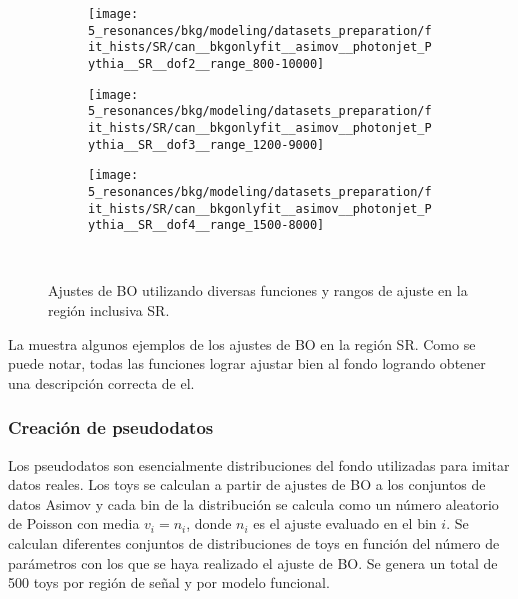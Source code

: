 \begin{figure}[ht!]
    \centering
    \begin{subfigure}[h]{0.32\linewidth}
        \centering
        \texttt{[image: 5\_resonances/bkg/modeling/datasets\_preparation/fit\_hists/SR/can\_\_bkgonlyfit\_\_asimov\_\_photonjet\_Pythia\_\_SR\_\_dof2\_\_range\_800-10000]}
    \end{subfigure}
    \hfill
    \begin{subfigure}[h]{0.32\linewidth}
        \centering
        \texttt{[image: 5\_resonances/bkg/modeling/datasets\_preparation/fit\_hists/SR/can\_\_bkgonlyfit\_\_asimov\_\_photonjet\_Pythia\_\_SR\_\_dof3\_\_range\_1200-9000]}
    \end{subfigure}
    \hfill
    \begin{subfigure}[h]{0.32\linewidth}
        \centering
        \texttt{[image: 5\_resonances/bkg/modeling/datasets\_preparation/fit\_hists/SR/can\_\_bkgonlyfit\_\_asimov\_\_photonjet\_Pythia\_\_SR\_\_dof4\_\_range\_1500-8000]}
    \end{subfigure}\\
    \caption{Ajustes de \ac{BO} utilizando diversas funciones y rangos de ajuste en la región inclusiva SR.}
    \label{fig:bkg:modeling:preparation:asimov_bkgonly:bkgonly_fits}
\end{figure}

La \Fig{\ref{fig:bkg:modeling:preparation:asimov_bkgonly:bkgonly_fits}} muestra algunos ejemplos de los ajustes de \ac{BO} en la región SR. Como se puede notar, todas las funciones lograr ajustar bien al fondo logrando obtener una descripción correcta de el.








\subsubsection{Creación de pseudodatos}
\label{subsubsec:bkg:modeling:preparation:toys}

Los pseudodatos son esencialmente distribuciones del fondo utilizadas para imitar datos reales. Los toys se calculan a partir de ajustes de \ac{BO} a los conjuntos de datos Asimov y cada bin de la distribución se calcula como un número aleatorio de Poisson con media \(v_i = n_i\), donde \(n_i\) es el ajuste evaluado en el bin \(i\). Se calculan diferentes conjuntos de distribuciones de toys en función del número de parámetros con los que se haya realizado el ajuste de \ac{BO}. Se genera un total de 500 toys por región de señal y por modelo funcional.

